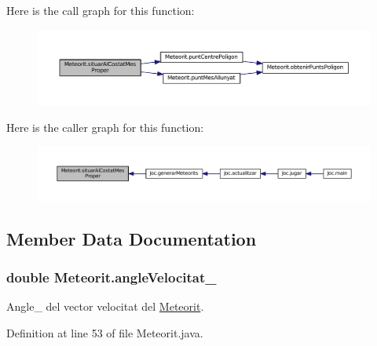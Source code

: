 Here is the call graph for this function\+:\nopagebreak
\begin{figure}[H]
\begin{center}
\leavevmode
\includegraphics[width=350pt]{class_meteorit_ab1e8e957f4ba216253d211523f2b3091_cgraph}
\end{center}
\end{figure}




Here is the caller graph for this function\+:\nopagebreak
\begin{figure}[H]
\begin{center}
\leavevmode
\includegraphics[width=350pt]{class_meteorit_ab1e8e957f4ba216253d211523f2b3091_icgraph}
\end{center}
\end{figure}




\subsection{Member Data Documentation}
\hypertarget{class_meteorit_ae642e495aeb2d78122cb2ae550dde61b}{}
\subsubsection[{angle\+Velocitat\+\_\+}]{\setlength{\rightskip}{0pt plus 5cm}double Meteorit.\+angle\+Velocitat\+\_\+\hspace{0.3cm}{\ttfamily [private]}}\label{class_meteorit_ae642e495aeb2d78122cb2ae550dde61b}


Angle\+\_\+ del vector velocitat del \hyperlink{class_meteorit}{Meteorit}. 



Definition at line 53 of file Meteorit.\+java.

